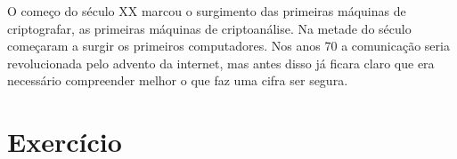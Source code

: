 O começo do século XX marcou o surgimento das primeiras máquinas de criptografar, as primeiras máquinas de criptoanálise. 
Na metade do século começaram a surgir os primeiros computadores.
Nos anos 70 a comunicação seria revolucionada pelo advento da internet, mas antes disso já ficara claro que era necessário compreender melhor o que faz uma cifra ser segura. 

\section{Exercício}
\label{sec:exercicio}






